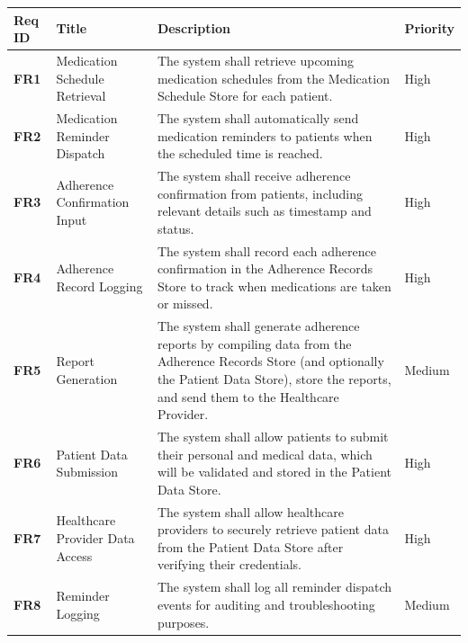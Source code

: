 \documentclass[
  12pt,
]{article}
\begin{document}
\begin{longtable}[]{@{}
  >{\raggedright\arraybackslash}p{}
  >{\raggedright\arraybackslash}p{}
  >{\raggedright\arraybackslash}p{}
  >{\raggedright\arraybackslash}p{}@{}}
\toprule\noalign{}
\begin{minipage}[b]{\linewidth}\raggedright
\textbf{Req ID}
\end{minipage} & \begin{minipage}[b]{\linewidth}\raggedright
\textbf{Title}
\end{minipage} & \begin{minipage}[b]{\linewidth}\raggedright
\textbf{Description}
\end{minipage} & \begin{minipage}[b]{\linewidth}\raggedright
\textbf{Priority}
\end{minipage} \\
\midrule\noalign{}
\endhead
\bottomrule\noalign{}
\endlastfoot
\textbf{FR1} & Medication Schedule Retrieval & The system shall retrieve
upcoming medication schedules from the Medication Schedule Store for
each patient. & High \\
\textbf{FR2} & Medication Reminder Dispatch & The system shall
automatically send medication reminders to patients when the scheduled
time is reached. & High \\
\textbf{FR3} & Adherence Confirmation Input & The system shall receive
adherence confirmation from patients, including relevant details such as
timestamp and status. & High \\
\textbf{FR4} & Adherence Record Logging & The system shall record each
adherence confirmation in the Adherence Records Store to track when
medications are taken or missed. & High \\
\textbf{FR5} & Report Generation & The system shall generate adherence
reports by compiling data from the Adherence Records Store (and
optionally the Patient Data Store), store the reports, and send them to
the Healthcare Provider. & Medium \\
\textbf{FR6} & Patient Data Submission & The system shall allow patients
to submit their personal and medical data, which will be validated and
stored in the Patient Data Store. & High \\
\textbf{FR7} & Healthcare Provider Data Access & The system shall allow
healthcare providers to securely retrieve patient data from the Patient
Data Store after verifying their credentials. & High \\
\textbf{FR8} & Reminder Logging & The system shall log all reminder
dispatch events for auditing and troubleshooting purposes. & Medium \\
\end{longtable}
\end{document}
